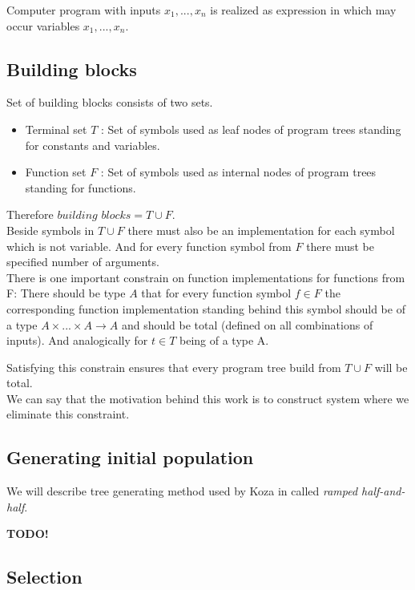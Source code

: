 \documentclass[12pt,a4paper]{report}
\begin{document}
Computer program with inputs $x_{1}, ..., x_{n}$ is realized as expression in which 
may occur variables $x_{1}, ..., x_{n}$.

\subsection{Building blocks}

Set of building blocks consists of two sets.

\begin{itemize}
	\item Terminal set $T$ : Set of symbols used as leaf nodes of 	               
	      program trees standing for constants and variables.
	\item Function set $F$ : Set of symbols used as internal nodes 
	      of program trees standing for functions.
\end{itemize}

Therefore $building$ $blocks = T \cup F$.\\

Beside symbols in $T \cup F$ there must also be 
an implementation for each symbol which is not variable. 
And for every function symbol from $F$ there must be specified 
number of arguments.\\

There is one important constrain on function implementations for functions from F:
There should be type $A$ that for every function symbol $f \in F$ the corresponding function implementation standing behind this symbol should be of a type 
$A \times ... \times A \rightarrow A$ and should be total (defined on all
combinations of inputs). And analogically for $t \in T$ being of a type A.  

Satisfying this constrain ensures that every program tree build 
from $T \cup F$ will be total.\\

We can say that the motivation behind this work is to construct system where we
eliminate this constraint. 

\subsection{Generating initial population}

We will describe tree generating method used by Koza in \cite{koza92} called
\textit{ramped half-and-half}. 

\textbf{TODO!}

\subsection{Selection}
\end{document}

